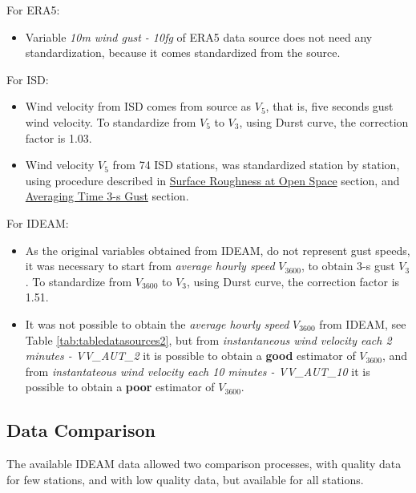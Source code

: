 \documentclass[12pt,oneside]{reedthesis}
\providecommand{\tightlist}{%
  \setlength{\itemsep}{0pt}\setlength{\parskip}{0pt}}
\begin{document}
For ERA5:
\begin{itemize}
\tightlist
\item
  Variable \emph{10m wind gust - 10fg} of ERA5 data source does not need any standardization, because it comes standardized from the source.
\end{itemize}
For ISD:
\begin{itemize}
\item
  Wind velocity from ISD comes from source as \(V_5\), that is, five seconds gust wind velocity. To standardize from \(V_5\) to \(V_3\), using Durst curve, the correction factor is 1.03.
\item
  Wind velocity \(V_5\) from 74 ISD stations, was standardized station by station, using procedure described in \protect\hyperlink{rmd-roughness}{Surface Roughness at Open Space} section, and \protect\hyperlink{rmd-gust}{Averaging Time 3-s Gust} section.
\end{itemize}
For IDEAM:
\begin{itemize}
\item
  As the original variables obtained from IDEAM, do not represent gust speeds, it was necessary to start from \emph{average hourly speed} \(V_{3600}\), to obtain 3-s gust \(V_3\). To standardize from \(V_{3600}\) to \(V_3\), using Durst curve, the correction factor is 1.51.
\item
  It was not possible to obtain the \emph{average hourly speed} \(V_{3600}\) from IDEAM, see Table \ref{tab:tabledatasources2}, but from \emph{instantaneous wind velocity each 2 minutes - VV\_AUT\_2} it is possible to obtain a \textbf{good} estimator of \(V_{3600}\), and from \emph{instantateous wind velocity each 10 minutes - VV\_AUT\_10} it is possible to obtain a \textbf{poor} estimator of \(V_{3600}\).
\end{itemize}
\hypertarget{data-comparison}{%
\subsection{Data Comparison}\label{data-comparison}}

The available IDEAM data allowed two comparison processes, with quality data for few stations, and with low quality data, but available for all stations.
\end{document}
